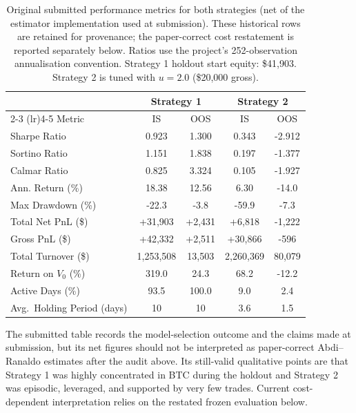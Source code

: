 \documentclass[10pt,a4paper]{article}
\begin{document}
\begin{table}[htbp]
\centering
\small
\setlength{\tabcolsep}{4pt}
\renewcommand{\arraystretch}{0.95}
\begin{tabular}{lcccc}
\toprule
& \multicolumn{2}{c}{Strategy 1} & \multicolumn{2}{c}{Strategy 2} \\
\cmidrule(lr){2-3} \cmidrule(lr){4-5}
Metric & IS & OOS & IS & OOS \\
\midrule
Sharpe Ratio              & 0.923  & 1.300  & 0.343  & -2.912 \\
Sortino Ratio             & 1.151  & 1.838  & 0.197  & -1.377 \\
Calmar Ratio              & 0.825  & 3.324  & 0.105  & -1.927 \\
Ann. Return (\%)          & 18.38  & 12.56  & 6.30   & -14.0  \\
Max Drawdown (\%)         & -22.3  & -3.8   & -59.9  & -7.3   \\
Total Net PnL (\$)        & +31,903 & +2,431 & +6,818 & -1,222 \\
Gross PnL (\$)            & +42,332 & +2,511 & +30,866 & -596 \\
Total Turnover (\$)       & 1,253,508 & 13,503 & 2,260,369 & 80,079 \\
Return on $V_0$ (\%)      & 319.0  & 24.3   & 68.2   & -12.2  \\
Active Days (\%)          & 93.5   & 100.0  & 9.0    & 2.4    \\
Avg.\ Holding Period (days) & 10 & 10 & 3.6 & 1.5 \\
\bottomrule
\end{tabular}
\caption{Original submitted performance metrics for both strategies (net of the estimator implementation used at submission). These historical rows are retained for provenance; the paper-correct cost restatement is reported separately below. Ratios use the project's 252-observation annualisation convention. Strategy 1 holdout start equity: \$41{,}903. Strategy 2 is tuned with $u = 2.0$ (\$20{,}000 gross).}
\label{tab:strategy_performance_combined}
\end{table}
\FloatBarrier

The submitted table records the model-selection outcome and the claims made at submission, but its net figures should not be interpreted as paper-correct Abdi--Ranaldo estimates after the audit above. Its still-valid qualitative points are that Strategy 1 was highly concentrated in BTC during the holdout and Strategy 2 was episodic, leveraged, and supported by very few trades. Current cost-dependent interpretation relies on the restated frozen evaluation below.
\end{document}
